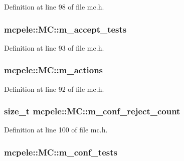 \-Definition at line 98 of file mc.\-h.

\hypertarget{classmcpele_1_1MC_aa28a68b36566e4c5e4bb27ae816c37ab}{
\subsubsection[{m\-\_\-accept\-\_\-tests}]{ {\bf mcpele\-::\-M\-C\-::m\-\_\-accept\-\_\-tests}}}\label{classmcpele_1_1MC_aa28a68b36566e4c5e4bb27ae816c37ab}


\-Definition at line 93 of file mc.\-h.

\hypertarget{classmcpele_1_1MC_a582e528bae7b630e6845628f49ae443d}{
\subsubsection[{m\-\_\-actions}]{ {\bf mcpele\-::\-M\-C\-::m\-\_\-actions}}}\label{classmcpele_1_1MC_a582e528bae7b630e6845628f49ae443d}


\-Definition at line 92 of file mc.\-h.

\hypertarget{classmcpele_1_1MC_a47bd41b121d3fda1ed69281454edd8c9}{
\subsubsection[{m\-\_\-conf\-\_\-reject\-\_\-count}]{\setlength{\rightskip}{0pt plus 5cm}size\-\_\-t {\bf mcpele\-::\-M\-C\-::m\-\_\-conf\-\_\-reject\-\_\-count}}}\label{classmcpele_1_1MC_a47bd41b121d3fda1ed69281454edd8c9}


\-Definition at line 100 of file mc.\-h.

\hypertarget{classmcpele_1_1MC_a444f1a159469de77761abced4a94dc48}{
\subsubsection[{m\-\_\-conf\-\_\-tests}]{ {\bf mcpele\-::\-M\-C\-::m\-\_\-conf\-\_\-tests}}}\label{classmcpele_1_1MC_a444f1a159469de77761abced4a94dc48}


